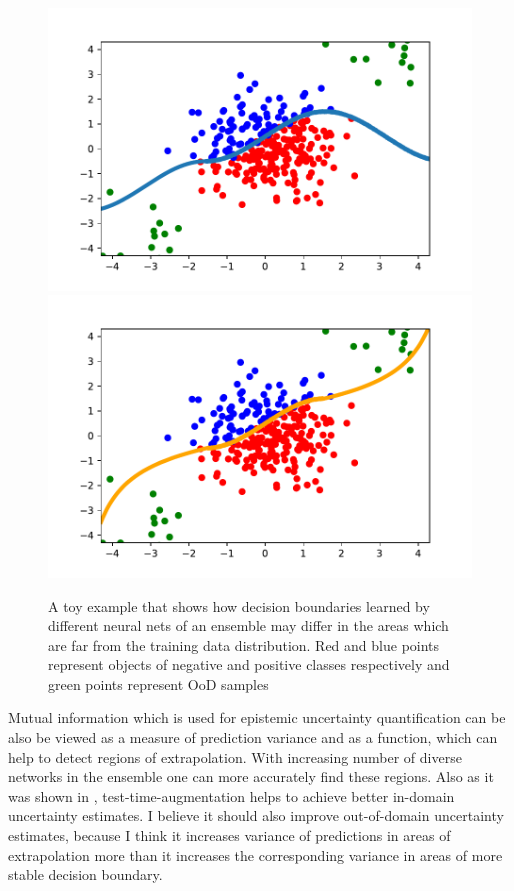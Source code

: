 \documentclass{article}
\begin{document}
\begin{figure}[h]
    \includegraphics[scale=0.45]{samples_div_1.pdf}
    \includegraphics[scale=0.45]{samples_div_2.pdf}
    \caption{A toy example that shows how decision boundaries learned by different neural nets of an ensemble may differ in the areas which are far from the training data distribution. Red and blue points represent objects of negative and positive classes respectively and green points represent OoD samples}
    \label{fig:decision_boundaries}
\end{figure}

    Mutual information which is used for epistemic uncertainty quantification can be also be viewed as a measure of prediction variance and as a function, which can help to detect regions of extrapolation. With increasing number of diverse networks in the ensemble one can more accurately find these regions. Also as it was shown in \cite{pitfalls}, test-time-augmentation helps to achieve better in-domain uncertainty estimates. I believe it should also improve out-of-domain uncertainty estimates, because I think it increases variance of predictions in areas of extrapolation more than it increases the corresponding variance in areas of more stable decision boundary.
\end{document}
